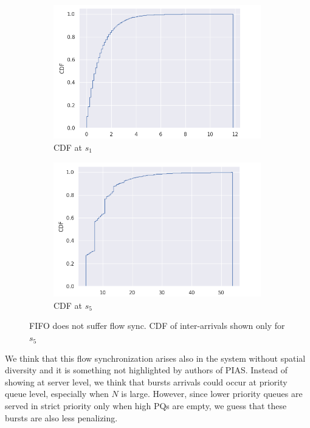 \begin{figure}
	\centering
	\begin{subfigure}{.45\textwidth}
		\centering
			\includegraphics[width=0.99\textwidth]{Chapter3/Figures/inter_arrival0_FIFO}
		\caption{CDF at $s_1$}
		\label{fig:iatimes-fifo-s1}
	\end{subfigure}%
	\hfill
	\begin{subfigure}{.45\textwidth}
		\centering
		\includegraphics[width=0.99\textwidth]{Chapter3/Figures/inter_arrival4_FIFO}
		\caption{CDF at $s_5$}
		\label{fig:iatimes-fifo-s5}
	\end{subfigure}%
	\caption{FIFO does not suffer flow sync. CDF of inter-arrivals shown only for $s_5$}
	\label{fig:iatimes-fifo}
\end{figure}%

We think that this flow synchronization arises also in the system without spatial diversity and it is something not highlighted by authors of PIAS. Instead of showing at server level, we think that bursts arrivals could occur at priority queue level, especially when $N$ is large. However, since lower priority queues are served in strict priority only when high PQs are empty, we guess that these bursts are also less penalizing. 
